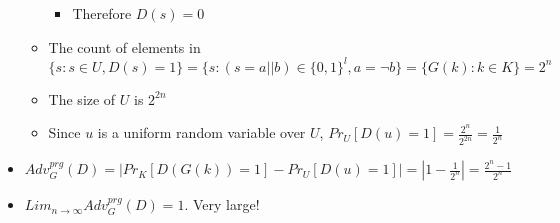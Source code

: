 \documentclass[]{article}
\begin{document}
\begin{itemize}
\begin{itemize}
\begin{itemize}
			\item Therefore $D(s) = 0$
		\end{itemize}
		\item The count of elements in $\{s: s \in U, D(s) = 1\} = \{s: (s = a || b) \in \{0,1\}^l, a = \lnot b\} = \{G(k): k \in K\} = 2^n$
		\item The size of $U$ is $2^{2n}$
		\item Since $u$ is a uniform random variable over $U$, $Pr_U[D(u) = 1] = \frac{2^n}{2^{2n}} = \frac{1}{2^n}$
	\end{itemize}
	\item $Adv^{prg}_G(D) = |Pr_K[D(G(k)) = 1] - Pr_U[D(u)=1]| = |1 - \frac{1}{2^n}| = \frac{2^n - 1}{2^n}$
	\item $Lim_{n \rightarrow \infty} Adv^{prg}_G(D) = 1$. Very large!
\end{itemize}
\end{document}
